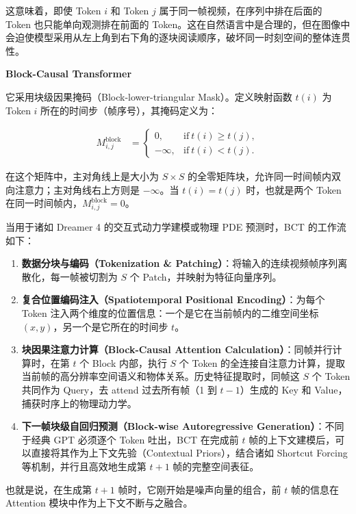 这意味着，即使 Token \(i\) 和 Token \(j\) 属于同一帧视频，在序列中排在后面的 Token 也只能单向观测排在前面的 Token。这在自然语言中是合理的，但在图像中会迫使模型采用从左上角到右下角的逐块阅读顺序，破坏同一时刻空间的整体连贯性。

\textbf{Block-Causal Transformer}

它采用块级因果掩码（Block-lower-triangular Mask）。定义映射函数 \(t(i)\) 为 Token \(i\) 所在的时间步（帧序号），其掩码定义为：

\[
\begin{aligned}
M^{\mathrm{block}}_{i,j}
&=
\begin{cases}
0, & \mathrm{if}\ t(i) \ge t(j), \\
-\infty, & \mathrm{if}\ t(i) < t(j).
\end{cases}
\end{aligned}
\]

在这个矩阵中，主对角线上是大小为 \(S \times S\) 的全零矩阵块，允许同一时间帧内双向注意力；主对角线右上方则是 \(-\infty\)。当 \(t(i) = t(j)\) 时，也就是两个 Token 在同一时间帧内，\(M^{\mathrm{block}}_{i,j} = 0\)。

当用于诸如 Dreamer 4 的交互式动力学建模或物理 PDE 预测时，BCT 的工作流如下：

\begin{enumerate}
\def\labelenumi{\arabic{enumi}.}
\tightlist
\item
  \textbf{数据分块与编码（Tokenization \& Patching）}：将输入的连续视频帧序列离散化，每一帧被切割为 \(S\) 个 Patch，并映射为特征向量序列。
\item
  \textbf{复合位置编码注入（Spatiotemporal Positional Encoding）}：为每个 Token 注入两个维度的位置信息：一个是它在当前帧内的二维空间坐标 \((x, y)\)，另一个是它所在的时间步 \(t\)。
\item
  \textbf{块因果注意力计算（Block-Causal Attention Calculation）}：同帧并行计算时，在第 \(t\) 个 Block 内部，执行 \(S\) 个 Token 的全连接自注意力计算，提取当前帧的高分辨率空间语义和物体关系。历史特征提取时，同帧这 \(S\) 个 Token 共同作为 Query，去 attend 过去所有帧（1 到 \(t - 1\)）生成的 Key 和 Value，捕获时序上的物理动力学。
\item
  \textbf{下一帧块级自回归预测（Block-wise Autoregressive Generation）}：不同于经典 GPT 必须逐个 Token 吐出，BCT 在完成前 \(t\) 帧的上下文建模后，可以直接将其作为上下文先验（Contextual Priors），结合诸如 Shortcut Forcing 等机制，并行且高效地生成第 \(t + 1\) 帧的完整空间表征。
\end{enumerate}

也就是说，在生成第 \(t+1\) 帧时，它刚开始是噪声向量的组合，前 \(t\) 帧的信息在 Attention 模块中作为上下文不断与之融合。

